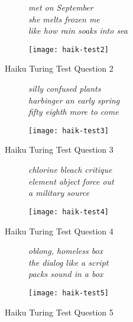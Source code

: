 \begin{figure}[H]
\centering
\begin{subfigure}[t!]{0.45\textwidth}
	\centering
    \textit{met on September\\she melts frozen me\\like how rain soaks into sea}
\end{subfigure}
\begin{subfigure}[t!]{0.45\textwidth}
	\centering
    \texttt{[image: haik-test2]}
\end{subfigure}
\caption{Haiku Turing Test Question 2}
\label{fig:haik-test2}
\end{figure}

\begin{figure}[H]
\centering
\begin{subfigure}[t!]{0.45\textwidth}
	\centering
    \textit{silly confused plants\\harbinger an early spring\\fifty eighth more to come}
\end{subfigure}
\begin{subfigure}[t!]{0.45\textwidth}
	\centering
    \texttt{[image: haik-test3]}
\end{subfigure}
\caption{Haiku Turing Test Question 3}
\label{fig:haik-test3}
\end{figure}

\begin{figure}[H]
\centering
\begin{subfigure}[t!]{0.45\textwidth}
	\centering
    \textit{chlorine bleach critique\\element abject force out\\a military source}
\end{subfigure}
\begin{subfigure}[t!]{0.45\textwidth}
	\centering
    \texttt{[image: haik-test4]}
\end{subfigure}
\caption{Haiku Turing Test Question 4}
\label{fig:haik-test4}
\end{figure}

\begin{figure}[H]
\centering
\begin{subfigure}[t!]{0.45\textwidth}
	\centering
    \textit{oblong, homeless box\\the dialog like a script\\packs sound in a box}
\end{subfigure}
\begin{subfigure}[t!]{0.45\textwidth}
	\centering
    \texttt{[image: haik-test5]}
\end{subfigure}
\caption{Haiku Turing Test Question 5}
\label{fig:haik-test5}
\end{figure}

